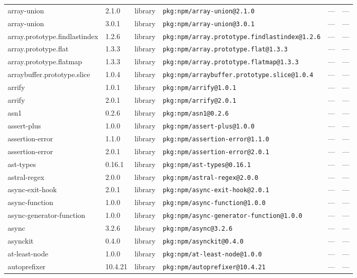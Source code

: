 \documentclass[11pt]{article}
\begin{document}
\begin{longtable}{|l|l|l|p{2.2cm}|l|p{4cm}|}
array-union & 2.1.0 & library & \texttt{pkg:npm/array-union@2.1.0} & — & — \\
array-union & 3.0.1 & library & \texttt{pkg:npm/array-union@3.0.1} & — & — \\
array.prototype.findlastindex & 1.2.6 & library & \texttt{pkg:npm/array.prototype.findlastindex@1.2.6} & — & — \\
array.prototype.flat & 1.3.3 & library & \texttt{pkg:npm/array.prototype.flat@1.3.3} & — & — \\
array.prototype.flatmap & 1.3.3 & library & \texttt{pkg:npm/array.prototype.flatmap@1.3.3} & — & — \\
arraybuffer.prototype.slice & 1.0.4 & library & \texttt{pkg:npm/arraybuffer.prototype.slice@1.0.4} & — & — \\
arrify & 1.0.1 & library & \texttt{pkg:npm/arrify@1.0.1} & — & — \\
arrify & 2.0.1 & library & \texttt{pkg:npm/arrify@2.0.1} & — & — \\
asn1 & 0.2.6 & library & \texttt{pkg:npm/asn1@0.2.6} & — & — \\
assert-plus & 1.0.0 & library & \texttt{pkg:npm/assert-plus@1.0.0} & — & — \\
assertion-error & 1.1.0 & library & \texttt{pkg:npm/assertion-error@1.1.0} & — & — \\
assertion-error & 2.0.1 & library & \texttt{pkg:npm/assertion-error@2.0.1} & — & — \\
ast-types & 0.16.1 & library & \texttt{pkg:npm/ast-types@0.16.1} & — & — \\
astral-regex & 2.0.0 & library & \texttt{pkg:npm/astral-regex@2.0.0} & — & — \\
async-exit-hook & 2.0.1 & library & \texttt{pkg:npm/async-exit-hook@2.0.1} & — & — \\
async-function & 1.0.0 & library & \texttt{pkg:npm/async-function@1.0.0} & — & — \\
async-generator-function & 1.0.0 & library & \texttt{pkg:npm/async-generator-function@1.0.0} & — & — \\
async & 3.2.6 & library & \texttt{pkg:npm/async@3.2.6} & — & — \\
asynckit & 0.4.0 & library & \texttt{pkg:npm/asynckit@0.4.0} & — & — \\
at-least-node & 1.0.0 & library & \texttt{pkg:npm/at-least-node@1.0.0} & — & — \\
autoprefixer & 10.4.21 & library & \texttt{pkg:npm/autoprefixer@10.4.21} & — & — \\

\end{longtable}
\end{document}
